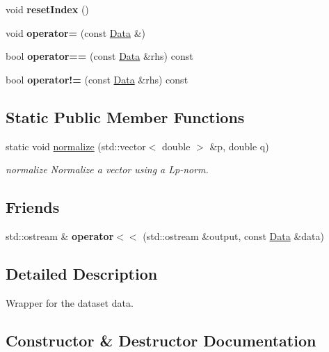 \begin{DoxyCompactItemize}
void {\bfseries reset\+Index} ()
\item 
\mbox{\label{class_data_a02affbc0f8564106c84dc59f34666912}} 
void {\bfseries operator=} (const \hyperlink{class_data}{Data} \&)
\item 
\mbox{\label{class_data_ae398cd0e79ba9f76e899c6e9b268c6af}} 
bool {\bfseries operator==} (const \hyperlink{class_data}{Data} \&rhs) const
\item 
\mbox{\label{class_data_a6f6255ce575dc38507700eea520d2242}} 
bool {\bfseries operator!=} (const \hyperlink{class_data}{Data} \&rhs) const
\end{DoxyCompactItemize}
\subsection*{Static Public Member Functions}
\begin{DoxyCompactItemize}
\item 
static void \hyperlink{class_data_acd8fd65a56a3d097d1bc19fb8249ee20}{normalize} (std\+::vector$<$ double $>$ \&p, double q)
\begin{DoxyCompactList}\small\item\em normalize Normalize a vector using a Lp-\/norm. \end{DoxyCompactList}\end{DoxyCompactItemize}
\subsection*{Friends}
\begin{DoxyCompactItemize}
\item 
\mbox{\label{class_data_ae7387779a206ec9f8d282b354e0c3316}} 
std\+::ostream \& {\bfseries operator$<$$<$} (std\+::ostream \&output, const \hyperlink{class_data}{Data} \&data)
\end{DoxyCompactItemize}


\subsection{Detailed Description}
Wrapper for the dataset data. 

\subsection{Constructor \& Destructor Documentation}
\mbox{\label{class_data_aa3ca35c963eec5a4734df23f88443077}} 
